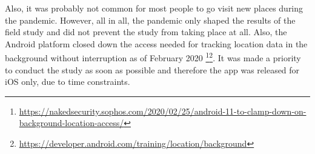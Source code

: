 Also, it was probably not common for most people to go visit new places during the pandemic. However, all in all, the pandemic only shaped the results of the field study and did not prevent the study from taking place at all. Also, the Android platform closed down the access needed for tracking location data in the background without interruption as of February 2020 \footnote{\url{https://nakedsecurity.sophos.com/2020/02/25/android-11-to-clamp-down-on-background-location-access/}}\footnote{\url{https://developer.android.com/training/location/background}}. It was made a priority to conduct the study as soon as possible and therefore the app was released for iOS only, due to time constraints.


